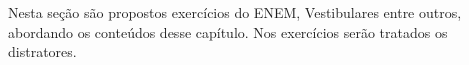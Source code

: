 \begin{apresentacao}

Nesta seção são propostos exercícios do ENEM, Vestibulares entre outros, abordando os conteúdos desse capítulo. Nos exercícios serão tratados os distratores.




\end{apresentacao}


